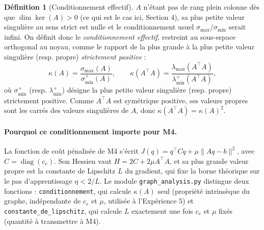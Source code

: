 \documentclass[11pt,a4paper]{article}
\theoremstyle{plain}
\theoremstyle{definition}
\newtheorem{definition}{Définition}
\theoremstyle{remark}
\begin{document}
\begin{definition}[Conditionnement effectif]
$A$ n'étant pas de rang plein colonne dès que $\dim \ker(A) > 0$ (ce qui
est le cas ici, Section 4), sa plus petite valeur singulière au sens
strict est nulle et le conditionnement usuel $\sigma_{\max}/\sigma_{\min}$
serait infini. On définit donc le \emph{conditionnement effectif}, restreint
au sous-espace orthogonal au noyau, comme le rapport de la plus grande à la
plus petite valeur singulière (resp. propre) \emph{strictement positive} :
\begin{equation}
\kappa(A) = \frac{\sigma_{\max}(A)}{\sigma_{\min}^{+}(A)}, \qquad
\kappa(A^\top A) = \frac{\lambda_{\max}(A^\top A)}{\lambda_{\min}^{+}(A^\top A)},
\end{equation}
où $\sigma_{\min}^{+}$ (resp. $\lambda_{\min}^{+}$) désigne la plus petite
valeur singulière (resp. propre) strictement positive. Comme $A^\top A$ est
symétrique positive, ses valeurs propres sont les carrés des valeurs
singulières de $A$, donc $\kappa(A^\top A) = \kappa(A)^2$.
\end{definition}

\paragraph{Pourquoi ce conditionnement importe pour M4.} La fonction de
coût pénalisée de M4 s'écrit $J(q) = q^\top C q + \mu \|Aq - b\|^2$, avec
$C = \operatorname{diag}(c_e)$. Son Hessien vaut $H = 2C + 2\mu A^\top A$,
et sa plus grande valeur propre est la constante de Lipschitz $L$ du
gradient, qui fixe la borne théorique sur le pas d'apprentissage
$\eta < 2/L$. Le module \texttt{graph\_analysis.py} distingue deux
fonctions : \texttt{conditionnement}, qui calcule $\kappa(A)$ seul
(propriété intrinsèque du graphe, indépendante de $c_e$ et $\mu$, utilisée
à l'Expérience 5) et \texttt{constante\_de\_lipschitz}, qui calcule $L$
exactement une fois $c_e$ et $\mu$ fixés (quantité à transmettre à M4).
\end{document}
